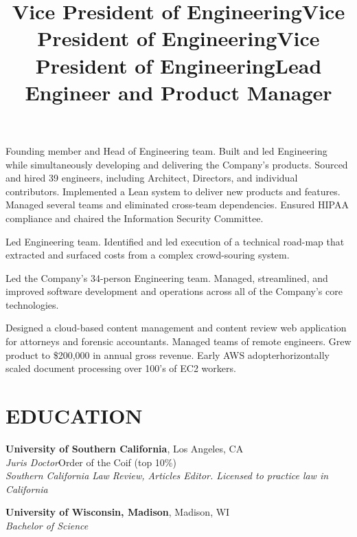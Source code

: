 \documentclass[margin]{res}
\begin{document}
\begin{resume}
\title{\textbf{Vice President of Engineering}}
\begin{position}
\hspace*{.5cm}Founding member and Head of Engineering team.  Built and led Engineering while simultaneously developing and delivering the Company's products. Sourced and hired 39 engineers, including Architect, Directors, and individual contributors.  Implemented a Lean system to deliver new products and features. Managed several teams and eliminated cross-team dependencies.  Ensured HIPAA compliance and chaired the Information Security Committee.  
\end{position}

\title{\textbf{Vice President of Engineering}}
\begin{position}
\hspace*{.5cm}Led Engineering team. Identified and led execution of a technical road-map that extracted and surfaced costs from a complex crowd-souring system.
\end{position}

\title{\textbf{Vice President of Engineering}}
\begin{position}
\hspace*{.5cm}Led the Company's 34-person Engineering team. Managed, streamlined, and improved software development and operations across all of the Company's core technologies.
\end{position}

\title{\textbf{Lead Engineer and Product Manager}}
\begin{position}
\hspace*{.5cm}Designed a cloud-based content management and content review web application for attorneys and forensic accountants.  Managed teams of remote engineers. Grew product to \$200,000 in annual gross revenue. Early AWS adopter\textemdash horizontally scaled document processing over 100's of EC2 workers.
\end{position}


\section{EDUCATION}

\textbf{University of Southern California}, Los Angeles, CA\\
{\sl Juris Doctor}\hfill Order of the Coif
(top 10\%)
\\
{\sl Southern California Law Review, Articles Editor. Licensed to practice law in California}

\textbf{University of Wisconsin, Madison}, Madison, WI\\
{\sl Bachelor of Science}

\end{resume}
\end{document}
